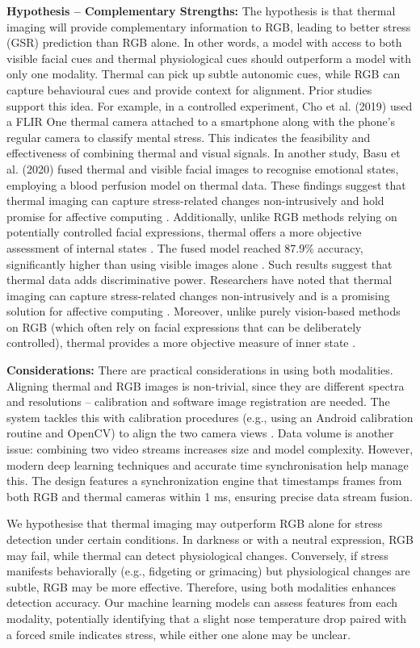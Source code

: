 \textbf{Hypothesis -- Complementary Strengths:} The hypothesis is that thermal imaging will provide complementary information to RGB, leading to better stress (GSR) prediction than RGB alone. In other words, a model with access to both visible facial cues and thermal physiological cues should outperform a model with only one modality. Thermal can pick up subtle autonomic cues, while RGB can capture behavioural cues and provide context for alignment. Prior studies support this idea. For example, in a controlled experiment, Cho et al. (2019) used a FLIR One thermal camera attached to a smartphone along with the phone's regular camera to classify mental stress. This indicates the feasibility and effectiveness of combining thermal and visual signals. In another study, Basu et al. (2020) fused thermal and visible facial images to recognise emotional states, employing a blood perfusion model on thermal data. These findings suggest that thermal imaging can capture stress-related changes non-intrusively and hold promise for affective computing \cite{ref10}. Additionally, unlike RGB methods relying on potentially controlled facial expressions, thermal offers a more objective assessment of internal states \cite{ref5}. The fused model reached 87.9\% accuracy, significantly higher than using visible images alone \cite{ref5}. Such results suggest that thermal data adds discriminative power. Researchers have noted that thermal imaging can capture stress-related changes non-intrusively and is a promising solution for affective computing \cite{ref10}. Moreover, unlike purely vision-based methods on RGB (which often rely on facial expressions that can be deliberately controlled), thermal provides a more objective measure of inner state \cite{ref5}.

\textbf{Considerations:} There are practical considerations in using both modalities. Aligning thermal and RGB images is non-trivial, since they are different spectra and resolutions -- calibration and software image registration are needed. The system tackles this with calibration procedures (e.g., using an Android calibration routine and OpenCV) to align the two camera views \cite{ref22}. Data volume is another issue: combining two video streams increases size and model complexity. However, modern deep learning techniques and accurate time synchronisation help manage this. The design features a synchronization engine that timestamps frames from both RGB and thermal cameras within 1 ms, ensuring precise data stream fusion.

We hypothesise that thermal imaging may outperform RGB alone for stress detection under certain conditions. In darkness or with a neutral expression, RGB may fail, while thermal can detect physiological changes. Conversely, if stress manifests behaviorally (e.g., fidgeting or grimacing) but physiological changes are subtle, RGB may be more effective. Therefore, using both modalities enhances detection accuracy. Our machine learning models can assess features from each modality, potentially identifying that a slight nose temperature drop paired with a forced smile indicates stress, while either one alone may be unclear.

